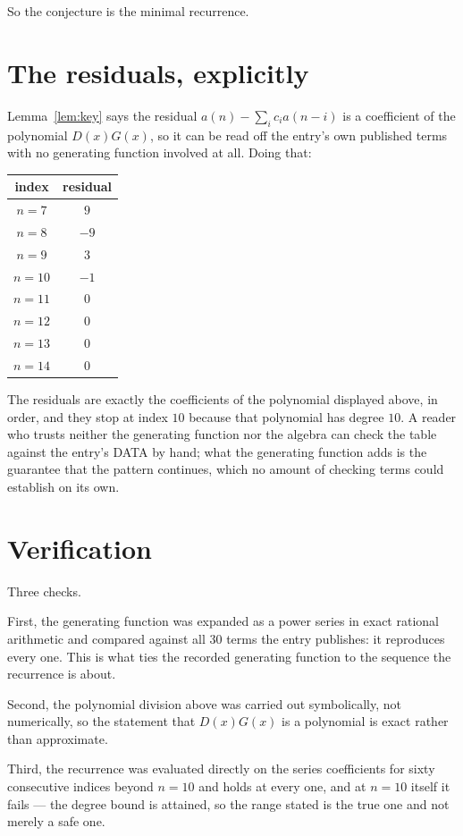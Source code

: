 \documentclass[11pt,a4paper]{article}
\theoremstyle{plain}
\theoremstyle{definition}
\begin{document}
So the conjecture is the minimal recurrence.

\section{The residuals, explicitly}

Lemma~\ref{lem:key} says the residual $a(n)-\sum_ic_ia(n-i)$ is a coefficient of the
polynomial $D(x)G(x)$, so it can be read off the entry's own published terms with no
generating function involved at all. Doing that:
\begin{center}
\begin{tabular}{cc}
index & residual \\ \hline
$n=7$ & $9$ \\
$n=8$ & $-9$ \\
$n=9$ & $3$ \\
$n=10$ & $-1$ \\
$n=11$ & $0$ \\
$n=12$ & $0$ \\
$n=13$ & $0$ \\
$n=14$ & $0$
\end{tabular}
\end{center}
The residuals are exactly the coefficients of the polynomial displayed above, in order, and
they stop at index $10$ because that polynomial has degree $10$. A reader who trusts
neither the generating function nor the algebra can check the table against the entry's DATA
by hand; what the generating function adds is the guarantee that the pattern continues, which
no amount of checking terms could establish on its own.

\section{Verification}

Three checks.

First, the generating function was expanded as a power series in exact rational arithmetic and
compared against all $30$ terms the entry publishes: it reproduces every one. This is
what ties the recorded generating function to the sequence the recurrence is about.

Second, the polynomial division above was carried out symbolically, not numerically, so the
statement that $D(x)G(x)$ is a polynomial is exact rather than approximate.

Third, the recurrence was evaluated directly on the series coefficients for sixty consecutive
indices beyond $n=10$ and holds at every one, and at $n=10$ itself it fails --- the
degree bound is attained, so the range stated is the true one and not merely a safe one.
\end{document}
